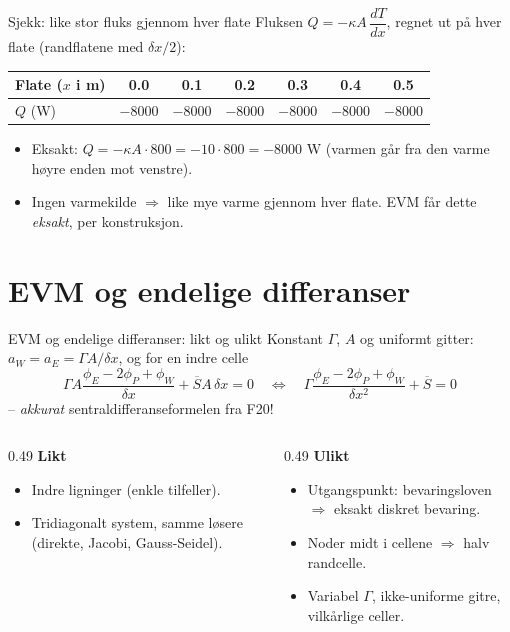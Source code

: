 \documentclass[11pt,aspectratio=169]{beamer}
\begin{document}
\begin{frame}{Sjekk: like stor fluks gjennom hver flate}
Fluksen $Q=-\kappa A\,\dfrac{dT}{dx}$, regnet ut på hver flate (randflatene med $\delta x/2$):
\begin{center}
\begin{tabular}{lcccccc}
\toprule
Flate ($x$ i m) & 0.0 & 0.1 & 0.2 & 0.3 & 0.4 & 0.5 \\
\midrule
$Q$ (W) & $-8000$ & $-8000$ & $-8000$ & $-8000$ & $-8000$ & $-8000$ \\
\bottomrule
\end{tabular}
\end{center}
\begin{itemize}
\item Eksakt: $Q = -\kappa A\cdot 800 = -10\cdot 800 = -8000$ W (varmen går fra den varme høyre enden mot venstre).
\item Ingen varmekilde $\Rightarrow$ like mye varme gjennom hver flate. EVM får dette \emph{eksakt}, per konstruksjon.
\end{itemize}
\end{frame}

\section{EVM og endelige differanser}

\begin{frame}{EVM og endelige differanser: likt og ulikt}
Konstant $\Gamma$, $A$ og uniformt gitter: $a_W=a_E=\Gamma A/\delta x$, og for en indre celle
\[
\Gamma A\frac{\phi_E-2\phi_P+\phi_W}{\delta x} + \overline S A\,\delta x = 0
\quad\Longleftrightarrow\quad
\Gamma\frac{\phi_E-2\phi_P+\phi_W}{\delta x^2} + \overline S = 0
\]
-- \emph{akkurat} sentraldifferanseformelen fra F20!
\begin{columns}[T]
\begin{column}{0.49\textwidth}
\textbf{Likt}
\begin{itemize}
\item Indre ligninger (enkle tilfeller).
\item Tridiagonalt system, samme løsere (direkte, Jacobi, Gauss-Seidel).
\end{itemize}
\end{column}
\begin{column}{0.49\textwidth}
\textbf{Ulikt}
\begin{itemize}
\item Utgangspunkt: bevaringsloven $\Rightarrow$ eksakt diskret bevaring.
\item Noder midt i cellene $\Rightarrow$ halv randcelle.
\item Variabel $\Gamma$, ikke-uniforme gitre, vilkårlige celler.
\end{itemize}
\end{column}
\end{columns}
\end{frame}
\end{document}

